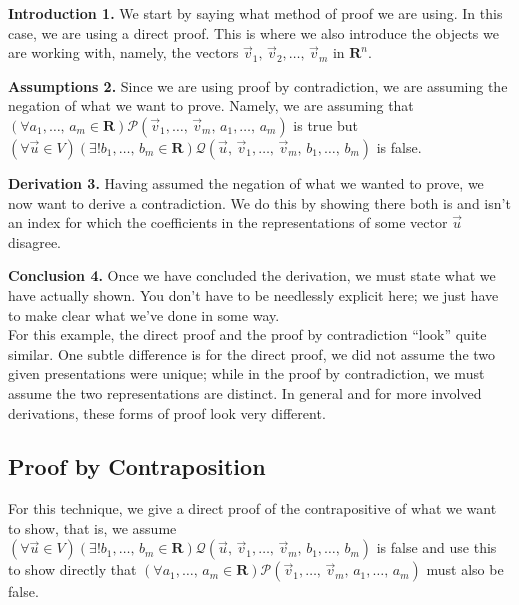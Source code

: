 \documentclass[a4paper,11pt]{article}
\newcommand{\R}{\mathbf{R}}
\newcommand{\PP}{\mathscr{P}}
\newcommand{\QQ}{\mathscr{Q}}
\begin{document}
{\bf Introduction 1.} We start by saying what method of proof we are using. In
this case, we are using a direct proof. This is where we also introduce the
objects we are working with, namely, the vectors $\vec v_1,\,\vec
v_2,\dots,\,\vec v_m$ in $\R^n$.

{\bf Assumptions 2.} Since we are using proof by contradiction, we are assuming
the negation of what we want to prove. Namely, we are assuming that $(\forall
a_1,\dots,\,a_m \in \R)\PP(\vec v_1,\dots,\,\vec v_m,\,a_1,\dots,\,a_m)$ is true
but $(\forall\vec u \in V)(\exists!b_1,\dots,\,b_m \in \R)\QQ(\vec u,\,\vec
v_1,\dots,\,\vec v_m,\,b_1,\dots,\,b_m)$ is false.

{\bf Derivation 3.} Having assumed the negation of what we wanted to prove, we
now want to derive a contradiction. We do this by showing there both is and
isn't an index for which the coefficients in the representations of some vector
$\vec u$ disagree.

{\bf Conclusion 4.} Once we have concluded the derivation, we must state what we
have actually shown. You don't have to be needlessly explicit here; we just have
to make clear what we've done in some way. \\

For this example, the direct proof and the proof by contradiction ``look'' quite
similar. One subtle difference is for the direct proof, we did not assume the
two given presentations were unique; while in the proof by contradiction, we
must assume the two representations are distinct. In general and for more
involved derivations, these forms of proof look very different.

\subsection*{Proof by Contraposition}

For this technique, we give a direct proof of the contrapositive of what we want
to show, that is, we assume $(\forall\vec u \in V)(\exists!b_1,\dots,\,b_m \in
\R)\QQ(\vec u,\,\vec v_1,\dots,\,\vec v_m,\,b_1,\dots,\,b_m)$ is false and use
this to show directly that $(\forall a_1,\dots,\,a_m \in \R)\PP(\vec
v_1,\dots,\,\vec v_m,\,a_1,\dots,\,a_m)$ must also be false.
\end{document}
